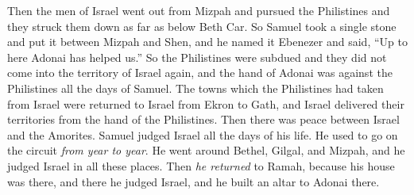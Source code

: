 \begin{biblechapter}
\verse Then the men of Israel went out from Mizpah and pursued the Philistines and they struck them down as far as below Beth Car.
\verse So Samuel took a single stone and put it between Mizpah and Shen, and he named it Ebenezer and said, “Up to here Adonai has helped us.”
\verse So the Philistines were subdued and they did not come into the territory of Israel again, and the hand of Adonai was against the Philistines all the days of Samuel.
\verse The towns which the Philistines had taken from Israel were returned to Israel from Ekron to Gath, and Israel delivered their territories from the hand of the Philistines. Then there was peace between Israel and the Amorites.
 Samuel judged Israel all the days of his life.
\verse He used to go on the circuit \textit{from year to year}. He went around Bethel, Gilgal, and Mizpah, and he judged Israel in all these places.
\verse Then \textit{he returned} to Ramah, because his house was there, and there he judged Israel, and he built an altar to Adonai there.
\end{biblechapter}

